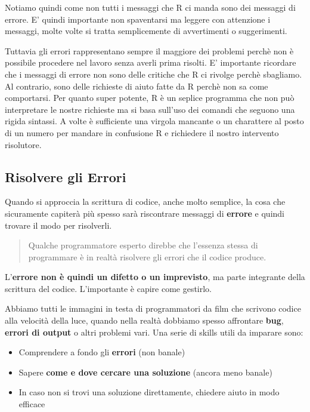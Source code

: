 \documentclass[
]{book}
\providecommand{\tightlist}{%
  \setlength{\itemsep}{0pt}\setlength{\parskip}{0pt}}
\begin{document}
Notiamo quindi come non tutti i messaggi che R ci manda sono dei messaggi di errore. E' quindi importante non spaventarsi ma leggere con attenzione i messaggi, molte volte si tratta semplicemente di avvertimenti o suggerimenti.

Tuttavia gli errori rappresentano sempre il maggiore dei problemi perchè non è possibile procedere nel lavoro senza averli prima risolti. E' importante ricordare che i messaggi di errore non sono delle critiche che R ci rivolge perchè sbagliamo. Al contrario, sono delle richieste di aiuto fatte da R perchè non sa come comportarsi. Per quanto super potente, R è un seplice programma che non può interpretare le nostre richieste ma si basa sull'uso dei comandi che seguono una rigida sintassi. A volte è sufficiente una virgola mancante o un charattere al posto di un numero per mandare in confusione R e richiedere il nostro intervento risolutore.

\hypertarget{risolvere-gli-errori}{%
\subsection{Risolvere gli Errori}\label{risolvere-gli-errori}}

Quando si approccia la scrittura di codice, anche molto semplice, la cosa che sicuramente capiterà più spesso sarà riscontrare messaggi di \textbf{errore} e quindi trovare il modo per risolverli.

\begin{quote}
Qualche programmatore esperto direbbe che l'essenza stessa di programmare è in realtà risolvere gli errori che il codice produce.
\end{quote}

L'\textbf{errore non è quindi un difetto o un imprevisto}, ma parte integrante della scrittura del codice. L'importante è capire come gestirlo.

Abbiamo tutti le immagini in testa di programmatori da film che scrivono codice alla velocità della luce, quando nella realtà dobbiamo spesso affrontare \textbf{bug}, \textbf{errori di output} o altri problemi vari. Una serie di skills utili da imparare sono:

\begin{itemize}
\tightlist
\item
  Comprendere a fondo gli \textbf{errori} (non banale)
\item
  Sapere \textbf{come e dove cercare una soluzione} (ancora meno banale)
\item
  In caso non si trovi una soluzione direttamente, chiedere aiuto in modo efficace
\end{itemize}
\end{document}
